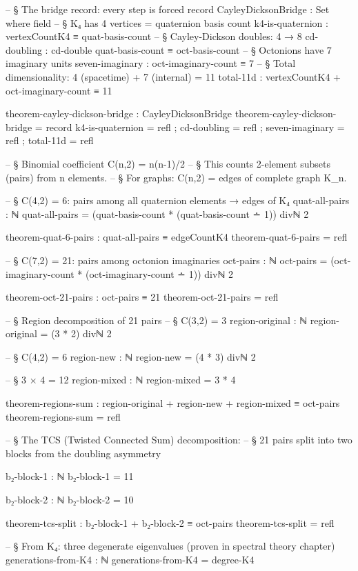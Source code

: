 \documentclass[11pt,a4paper]{book}
\begin{document}
\begin{code}
-- § The bridge record: every step is forced
record CayleyDicksonBridge : Set where
  field
    -- § K₄ has 4 vertices = quaternion basis count
    k4-is-quaternion    : vertexCountK4 ≡ quat-basis-count
    -- § Cayley-Dickson doubles: 4 → 8
    cd-doubling         : cd-double quat-basis-count ≡ oct-basis-count
    -- § Octonions have 7 imaginary units
    seven-imaginary     : oct-imaginary-count ≡ 7
    -- § Total dimensionality: 4 (spacetime) + 7 (internal) = 11
    total-11d           : vertexCountK4 + oct-imaginary-count ≡ 11

theorem-cayley-dickson-bridge : CayleyDicksonBridge
theorem-cayley-dickson-bridge = record
  { k4-is-quaternion  = refl
  ; cd-doubling       = refl
  ; seven-imaginary   = refl
  ; total-11d         = refl
  }

-- § Binomial coefficient C(n,2) = n(n-1)/2
-- § This counts 2-element subsets (pairs) from n elements.
-- § For graphs: C(n,2) = edges of complete graph K_n.

-- § C(4,2) = 6: pairs among all quaternion elements → edges of K₄
quat-all-pairs : ℕ
quat-all-pairs = (quat-basis-count * (quat-basis-count ∸ 1)) divℕ 2

theorem-quat-6-pairs : quat-all-pairs ≡ edgeCountK4
theorem-quat-6-pairs = refl

-- § C(7,2) = 21: pairs among octonion imaginaries
oct-pairs : ℕ
oct-pairs = (oct-imaginary-count * (oct-imaginary-count ∸ 1)) divℕ 2

theorem-oct-21-pairs : oct-pairs ≡ 21
theorem-oct-21-pairs = refl

-- § Region decomposition of 21 pairs
-- § C(3,2) = 3
region-original : ℕ
region-original = (3 * 2) divℕ 2

-- § C(4,2) = 6
region-new : ℕ
region-new = (4 * 3) divℕ 2

-- § 3 × 4 = 12
region-mixed : ℕ
region-mixed = 3 * 4

theorem-regions-sum : region-original + region-new + region-mixed ≡ oct-pairs
theorem-regions-sum = refl

-- § The TCS (Twisted Connected Sum) decomposition:
-- § 21 pairs split into two blocks from the doubling asymmetry

b₂-block-1 : ℕ
b₂-block-1 = 11

b₂-block-2 : ℕ
b₂-block-2 = 10

theorem-tcs-split : b₂-block-1 + b₂-block-2 ≡ oct-pairs
theorem-tcs-split = refl

-- § From K₄: three degenerate eigenvalues (proven in spectral theory chapter)
generations-from-K4 : ℕ
generations-from-K4 = degree-K4


\end{code}
\end{document}
